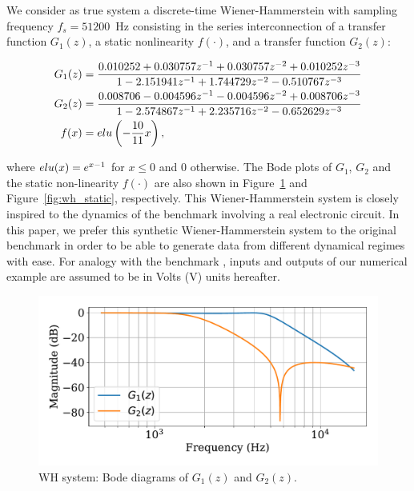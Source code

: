 \documentclass{ifacconf}
\begin{document}
We consider as true system a discrete-time Wiener-Hammerstein with sampling frequency $f_s=51200$~Hz consisting in the series interconnection of a transfer function $G_1(z)$, a static nonlinearity $f(\cdot)$, and a transfer function $G_2(z)$:
\begin{small}
\begin{align*}
 G_1(z) &= \frac{0.010252 + 0.030757z^{-1} + 0.030757z^{-2} + 0.010252z^{-3}}{ 1 -2.151941z^{-1} + 1.744729z^{-2} -0.510767z^{-3}}\\
 G_2(z) &= \frac{0.008706 -0.004596z^{-1} - 0.004596z^{-2} + 0.008706z^{-3}}{1 -2.574867z^{-1} + 2.235716z^{-2} -0.652629z^{-3}}\\
 f(x) &= {\rm elu}\left (-\frac{10}{11}x \right ),
 \end{align*}
\end{small}
where ${\rm elu}(x) = e^{x-1}$ for $x \leq 0$ and $0$ otherwise.
The Bode plots of $G_1$, $G_2$ and the static non-linearity $f(\cdot)$ are also shown in Figure~\ref{fig:wh_bode} and Figure~\ref{fig:wh_static}, respectively.
{
This Wiener-Hammerstein system is closely inspired to the dynamics of the benchmark \citep{schoukens2009wiener} involving a real electronic circuit. In this paper, we prefer this synthetic Wiener-Hammerstein system to the original benchmark in order to be able to generate data from different dynamical regimes with ease.} %
{For analogy with the benchmark \citep{schoukens2009wiener}, inputs and outputs of our numerical example are assumed to be in Volts (V) units hereafter.}
\begin{figure}
 \centering
 \includegraphics[width=.7\linewidth]{img/wh_bode_mag.pdf}
 \caption{WH system: Bode diagrams of $G_1(z)$ and $G_2(z)$.}
 \label{fig:wh_bode}
\end{figure}
\end{document}
